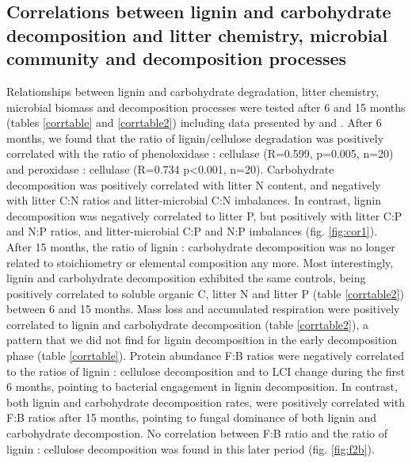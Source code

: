 \subsection*{Correlations between lignin and carbohydrate decomposition and litter chemistry, microbial community and decomposition processes}

Relationships between lignin and carbohydrate degradation, litter chemistry, microbial biomass and decomposition processes were tested after 6 and 15 months (tables \ref{corrtable} and \ref{corrtable2}) including data presented by \cite{Mooshammer2011} and \cite{Leitner2011}. After 6 months, we found that the ratio of lignin/cellulose degradation was positively correlated with the ratio of phenoloxidase : cellulase (R=0.599, p=0.005, n=20) and peroxidase : cellulase (R=0.734 p\textless 0.001, n=20). Carbohydrate decomposition was positively correlated with litter N content, and negatively with litter C:N ratios and litter-microbial C:N imbalances. In contrast, lignin decomposition was negatively correlated to litter P, but positively with litter C:P and N:P ratios, and litter-microbial C:P and N:P imbalances (fig. \ref{fig:cor1}). After 15 months, the ratio of lignin : carbohydrate decomposition was no longer related to stoichiometry or elemental composition any more. Most interestingly, lignin and carbohydrate decomposition exhibited the same controls, being positively correlated to soluble organic C, litter N and litter P (table \ref{corrtable2}) between 6 and 15 months. Mass loss and accumulated respiration were positively correlated to lignin and carbohydrate decomposition (table \ref{corrtable2}), a pattern that we did not find for lignin decomposition in the early decomposition phase (table \ref{corrtable}). Protein abundance F:B ratios were negatively correlated to the ratios of lignin : cellulose decomposition and to LCI change during the first 6 months, pointing to bacterial engagement in lignin decomposition. In contrast, both lignin and carbohydrate decomposition rates, were positively correlated with F:B ratios after 15 months, pointing to fungal dominance of both lignin and carbohydrate decompostion. No correlation between F:B ratio and the ratio of lignin : cellulose decomposition was found in this later period (fig. \ref{fig:f2b}).


